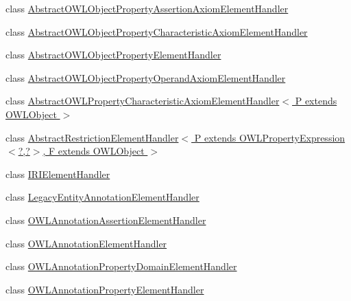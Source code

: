 \begin{DoxyCompactItemize}
class \hyperlink{classorg_1_1coode_1_1owlapi_1_1owlxmlparser_1_1_abstract_o_w_l_object_property_assertion_axiom_element_handler}{Abstract\-O\-W\-L\-Object\-Property\-Assertion\-Axiom\-Element\-Handler}
\item 
class \hyperlink{classorg_1_1coode_1_1owlapi_1_1owlxmlparser_1_1_abstract_o_w_l_object_property_characteristic_axiom_element_handler}{Abstract\-O\-W\-L\-Object\-Property\-Characteristic\-Axiom\-Element\-Handler}
\item 
class \hyperlink{classorg_1_1coode_1_1owlapi_1_1owlxmlparser_1_1_abstract_o_w_l_object_property_element_handler}{Abstract\-O\-W\-L\-Object\-Property\-Element\-Handler}
\item 
class \hyperlink{classorg_1_1coode_1_1owlapi_1_1owlxmlparser_1_1_abstract_o_w_l_object_property_operand_axiom_element_handler}{Abstract\-O\-W\-L\-Object\-Property\-Operand\-Axiom\-Element\-Handler}
\item 
class \hyperlink{classorg_1_1coode_1_1owlapi_1_1owlxmlparser_1_1_abstract_o_w_l_property_characteristic_axiom_ele9cffca01c8ac3125149e1d413d627e29}{Abstract\-O\-W\-L\-Property\-Characteristic\-Axiom\-Element\-Handler$<$ P extends O\-W\-L\-Object $>$}
\item 
class \hyperlink{classorg_1_1coode_1_1owlapi_1_1owlxmlparser_1_1_abstract_restriction_element_handler_3_01_p_01ex1af432a427073023608ad4746636c054}{Abstract\-Restriction\-Element\-Handler$<$ P extends O\-W\-L\-Property\-Expression$<$?,?$>$, F extends O\-W\-L\-Object $>$}
\item 
class \hyperlink{classorg_1_1coode_1_1owlapi_1_1owlxmlparser_1_1_i_r_i_element_handler}{I\-R\-I\-Element\-Handler}
\item 
class \hyperlink{classorg_1_1coode_1_1owlapi_1_1owlxmlparser_1_1_legacy_entity_annotation_element_handler}{Legacy\-Entity\-Annotation\-Element\-Handler}
\item 
class \hyperlink{classorg_1_1coode_1_1owlapi_1_1owlxmlparser_1_1_o_w_l_annotation_assertion_element_handler}{O\-W\-L\-Annotation\-Assertion\-Element\-Handler}
\item 
class \hyperlink{classorg_1_1coode_1_1owlapi_1_1owlxmlparser_1_1_o_w_l_annotation_element_handler}{O\-W\-L\-Annotation\-Element\-Handler}
\item 
class \hyperlink{classorg_1_1coode_1_1owlapi_1_1owlxmlparser_1_1_o_w_l_annotation_property_domain_element_handler}{O\-W\-L\-Annotation\-Property\-Domain\-Element\-Handler}
\item 
class \hyperlink{classorg_1_1coode_1_1owlapi_1_1owlxmlparser_1_1_o_w_l_annotation_property_element_handler}{O\-W\-L\-Annotation\-Property\-Element\-Handler}

\end{DoxyCompactItemize}
